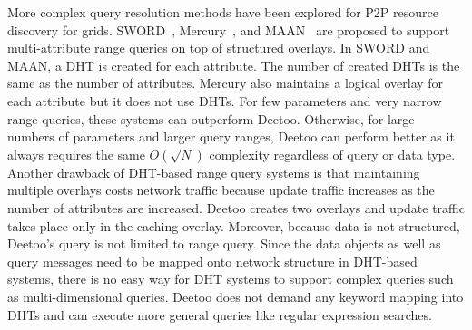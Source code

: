 \documentclass[9.5pt,journal,final,finalsubmission,twocolumn]{IEEEtran}
\begin{document}
More complex query resolution methods have been explored for P2P resource 
discovery for grids. SWORD~\cite{sword}, 
Mercury~\cite{mercury}, and MAAN~\cite{maan} 
are proposed to support multi-attribute 
range queries on top of structured overlays.
In SWORD and MAAN, a DHT is created for each attribute.
The number of created DHTs is the same as the number of attributes.
Mercury also maintains a logical overlay for each attribute but
it does not use DHTs. For few parameters and very narrow range queries,
these systems can outperform Deetoo. 
Otherwise, for large numbers of parameters and larger query ranges, 
Deetoo can perform better as it always requires the same $O(\sqrt{N})$
complexity regardless of query or data type.
Another drawback of DHT-based range query systems is
that maintaining multiple overlays 
costs network traffic
because update traffic increases as the number of attributes are 
increased. Deetoo creates two overlays and update traffic takes 
place only in the caching overlay. 
Moreover, because data is not structured,
Deetoo's query is not limited to range query. 
Since the data objects as well as query messages need to be mapped 
onto network structure in DHT-based systems, there is no easy way
for DHT systems to support complex queries such as multi-dimensional 
queries.
Deetoo does not demand any keyword mapping 
into DHTs and can execute more general queries like regular expression searches.
\end{document}
